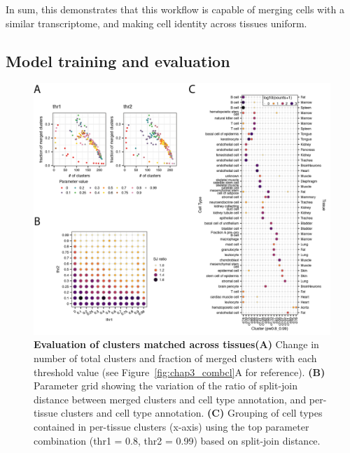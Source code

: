 In sum, this demonstrates that this workflow is capable of merging cells with a similar transcriptome, and making cell identity across tissues uniform.


\subsection{Model training and evaluation}
\label{section3.2.3}

\begin{figure}[ht!] %
    \centering    
    \includegraphics[width=1.0\textwidth]{Chapter3/Figs/chap3_combineData.png} %
    \caption[Evaluation of clusters matched across tissues]{\textbf{Evaluation of clusters matched across tissues}\newline\textbf{(A)} Change in number of total clusters and fraction of merged clusters with each threshold value (see Figure~\ref{fig:chap3_combcl}A for reference). \textbf{(B)} Parameter grid showing the variation of the ratio of split-join distance between merged clusters and cell type annotation, and per-tissue clusters and cell type annotation. \textbf{(C)} Grouping of cell types contained in per-tissue clusters (x-axis) using the top parameter combination (thr1 = 0.8, thr2 = 0.99) based on split-join distance.}
    \label{fig:chap3_combdat}
\end{figure}

